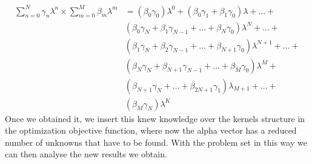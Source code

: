 \begin{equation}
  \begin{split}
    \sum_{n=0}^N\gamma_n \lambda^n \times \sum_{m=0}^M \beta_m \lambda^m &= (\beta_0  \gamma_0)\lambda^0   + (\beta_0 \gamma_1 + \beta_1 \gamma_0)\lambda + \dots + \\
    &(\beta_0 \gamma_N + \beta_1 \gamma_{N-1} + \dots + \beta_N \gamma_0)\lambda^N + \dots + \\
    &(\beta_1 \gamma_N + \beta_2 \gamma_{N-1} + \dots + \beta_{N+1} \gamma_0)\lambda^{N+1} + \dots +\\
    &(\beta_{N} \gamma_{N} + \beta_{N+1} \gamma_{N-1} + \dots + \beta_{M} \gamma_0)\lambda^{M} + \\
    &(\beta_{N+1} \gamma_{N} + \dots + \beta_{2N + 1} \gamma_1)\lambda_{M+1} + \dots +\\
    &(\beta_M \gamma_N)\lambda^{K}
  \end{split}
  \label{eq:sviluppo}
\end{equation}
Once we obtained it, we insert this knew knowledge over the kernels structure in the optimization objective function, where now the alpha vector has a reduced number of unknowns that have to be found. With the problem set in this way we can then analyse the new results we obtain. 

